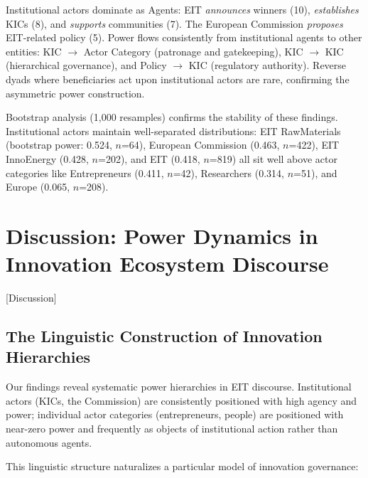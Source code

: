 \documentclass[../main.tex]{subfiles}
\begin{document}
Institutional actors dominate as Agents: EIT \textit{announces} winners (10), \textit{establishes} KICs (8), and \textit{supports} communities (7). The European Commission \textit{proposes} EIT-related policy (5). Power flows consistently from institutional agents to other entities: KIC $\rightarrow$ Actor Category (patronage and gatekeeping), KIC $\rightarrow$ KIC (hierarchical governance), and Policy $\rightarrow$ KIC (regulatory authority). Reverse dyads where beneficiaries act upon institutional actors are rare, confirming the asymmetric power construction.

Bootstrap analysis (1,000 resamples) confirms the stability of these findings. Institutional actors maintain well-separated distributions: EIT RawMaterials (bootstrap power: 0.524, $n$=64), European Commission (0.463, $n$=422), EIT InnoEnergy (0.428, $n$=202), and EIT (0.418, $n$=819) all sit well above actor categories like Entrepreneurs (0.411, $n$=42), Researchers (0.314, $n$=51), and Europe (0.065, $n$=208).

\section{Discussion: Power Dynamics in Innovation Ecosystem Discourse}[Discussion]

\subsection{The Linguistic Construction of Innovation Hierarchies}

Our findings reveal systematic power hierarchies in EIT discourse. Institutional actors (KICs, the Commission) are consistently positioned with high agency and power; individual actor categories (entrepreneurs, people) are positioned with near-zero power and frequently as objects of institutional action rather than autonomous agents.

This linguistic structure naturalizes a particular model of innovation governance:
\end{document}
